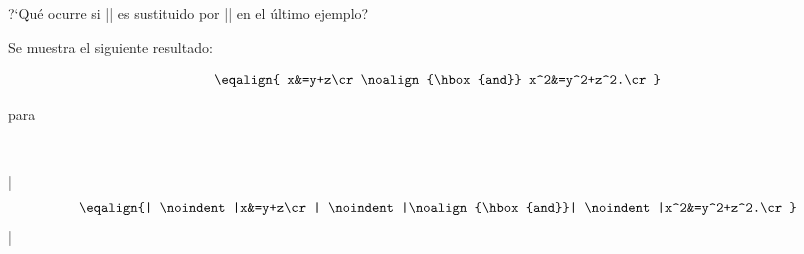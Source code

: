 

\enunciadoS ?`Qu\'e ocurre si |\eqalignno| es sustituido por
|\eqalignno| en el \'ultimo ejemplo?

\bigskip

\respuestaS Se muestra el siguiente resultado:

$$\eqalign{
x&=y+z\cr
\noalign{\hbox{and}}
x^2&=y^2+z^2.\cr}$$

\noindent para

\

\noindent|$$\eqalign{|

\noindent|x&=y+z\cr|

\noindent|\noalign{\hbox{and}}|

\noindent|x^2&=y^2+z^2.\cr}$$|

\bye

